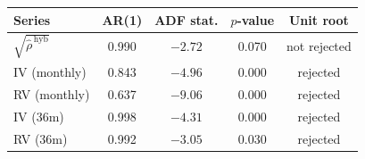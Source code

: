 \begin{tabular}{lcccc}
  \toprule
  Series & AR(1) & ADF stat. & $p$-value & Unit root \\
  \midrule
      $\sqrt{\widehat{\rho}^{\,\mathrm{hyb}}}$ & 0.990 & $-2.72$ & 0.070 & not rejected \\
      IV (monthly) & 0.843 & $-4.96$ & 0.000 & rejected \\
      RV (monthly) & 0.637 & $-9.06$ & 0.000 & rejected \\
      IV (36m) & 0.998 & $-4.31$ & 0.000 & rejected \\
      RV (36m) & 0.992 & $-3.05$ & 0.030 & rejected \\
  \bottomrule
\end{tabular}
